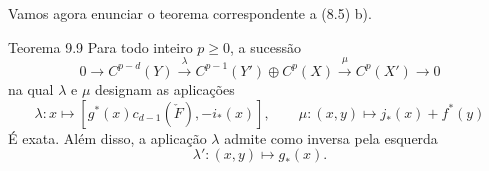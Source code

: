 Vamos agora enunciar o teorema correspondente a (8.5) b).

\begin{statement}{Teorema 9.9}
Para todo inteiro $p\ge0$, a sucessão
\[
0\to C^{p-d}(Y)\xrightarrow{\lambda} C^{p-1}(Y')\oplus C^p(X)\xrightarrow{\mu} C^p(X')\to0
\]
na qual $\lambda$ e $\mu$ designam as aplicações
\[
\lambda:x\mapsto[g^*(x)c_{d-1}(\check F),-i_*(x)],
\qquad
\mu:(x,y)\mapsto j_*(x)+f^*(y)
\]
É exata. Além disso, a aplicação $\lambda$ admite como inversa pela esquerda
\[
\lambda':(x,y)\mapsto g_*(x).
\]
\end{statement}
